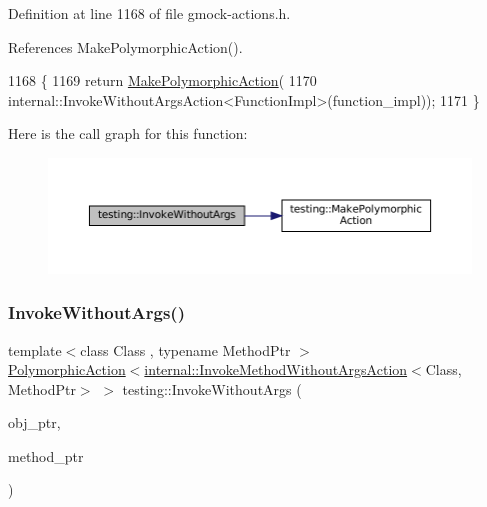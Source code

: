Definition at line 1168 of file gmock-\/actions.\+h.



References Make\+Polymorphic\+Action().


\begin{DoxyCode}
1168                                               \{
1169   \textcolor{keywordflow}{return} \hyperlink{namespacetesting_a36bd06c5ea972c6df0bd9f40a7a94c65}{MakePolymorphicAction}(
1170       internal::InvokeWithoutArgsAction<FunctionImpl>(function\_impl));
1171 \}
\end{DoxyCode}
Here is the call graph for this function\+:
\nopagebreak
\begin{figure}[H]
\begin{center}
\leavevmode
\includegraphics[width=350pt]{namespacetesting_a88cc1999296bc630f6a49cdf66bb21f9_cgraph}
\end{center}
\end{figure}
\mbox{\label{namespacetesting_ab75325d71a8c37db94f349243815c728}} 
\subsubsection{\texorpdfstring{Invoke\+Without\+Args()}{InvokeWithoutArgs()}\hspace{0.1cm}{\footnotesize\ttfamily [2/2]}}
{\footnotesize\ttfamily template$<$class Class , typename Method\+Ptr $>$ \\
\hyperlink{classtesting_1_1PolymorphicAction}{Polymorphic\+Action}$<$\hyperlink{classtesting_1_1internal_1_1InvokeMethodWithoutArgsAction}{internal\+::\+Invoke\+Method\+Without\+Args\+Action}$<$Class, Method\+Ptr$>$ $>$ testing\+::\+Invoke\+Without\+Args (\begin{DoxyParamCaption}\item[{Class $\ast$}]{obj\+\_\+ptr,  }\item[{Method\+Ptr}]{method\+\_\+ptr }\end{DoxyParamCaption})}



